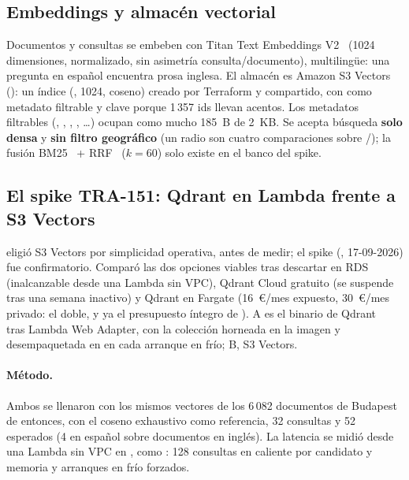 \subsection{Embeddings y almacén vectorial}

Documentos y consultas se embeben con Titan Text Embeddings V2~\cite{ai:titanv2}
(1024 dimensiones, normalizado, sin asimetría consulta/documento), multilingüe: una pregunta en
español encuentra prosa inglesa. El almacén es Amazon S3 Vectors~\cite{ai:s3vectors}
(): un índice  (, 1024, coseno) creado por Terraform y
compartido, con  como metadato filtrable y clave  porque 1\,357
ids llevan acentos. Los metadatos filtrables (, , ,
, \dots) ocupan como mucho 185~B de 2~KB. Se acepta búsqueda
\textbf{solo densa} y \textbf{sin filtro geográfico} (un radio son cuatro comparaciones sobre
/); la fusión BM25~\cite{ai:robertson2009bm25} +
RRF~\cite{ai:cormack2009rrf} ($k=60$) solo existe en el banco del spike.

\subsection{El spike TRA-151: Qdrant en Lambda frente a S3 Vectors}

 eligió S3 Vectors por simplicidad operativa, antes de medir; el spike
(, 17-09-2026) fue confirmatorio. Comparó las dos opciones viables tras
descartar  en RDS (inalcanzable desde una Lambda sin VPC),
Qdrant Cloud gratuito (se suspende tras una semana
inactivo) y Qdrant en Fargate (16~€/mes expuesto, 30~€/mes privado: el doble, y ya el presupuesto íntegro de ). A es el
binario de Qdrant~\cite{ai:qdrant} tras Lambda Web Adapter, con la colección horneada en la imagen
y desempaquetada en  en cada arranque en frío; B, S3 Vectors.

\paragraph{Método.} Ambos se llenaron con los mismos vectores de los 6\,082 documentos de
Budapest de entonces, con el coseno exhaustivo como referencia, 32 consultas y 52 
esperados (4 en español sobre documentos en inglés). La latencia se midió desde una Lambda sin
VPC en , como : 128 consultas en caliente por candidato y memoria y
arranques en frío forzados.

